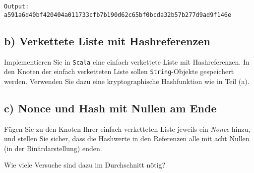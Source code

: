 
\begin{verbatim}
Output: a591a6d40bf420404a011733cfb7b190d62c65bf0bcda32b57b277d9ad9f146e
\end{verbatim}

\vspace{1em}

\subsection*{b) Verkettete Liste mit Hashreferenzen}

Implementieren Sie in \texttt{Scala} eine einfach verkettete Liste mit Hashreferenzen.  
In den Knoten der einfach verketteten Liste sollen \texttt{String}-Objekte gespeichert werden.  
Verwenden Sie dazu eine kryptographische Hashfunktion wie in Teil (a).

\vspace{1em}

\subsection*{c) Nonce und Hash mit Nullen am Ende}

Fügen Sie zu den Knoten Ihrer einfach verketteten Liste jeweils ein \emph{Nonce} hinzu,  
und stellen Sie sicher, dass die Hashwerte in den Referenzen alle mit acht Nullen (in der Binärdarstellung) enden.  

Wie viele Versuche sind dazu im Durchschnitt nötig?
